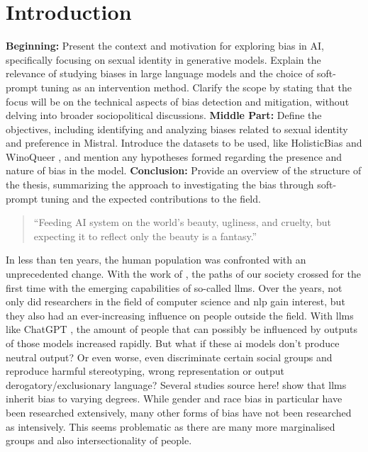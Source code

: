 
\chapter{Introduction}
\textcolor{bhtBlue}{
\textbf{Beginning:} Present the context and motivation for exploring bias in AI, specifically focusing on sexual identity in generative models. Explain the relevance of studying biases in large language models and the choice of soft-prompt tuning as an intervention method. Clarify the scope by stating that the focus will be on the technical aspects of bias detection and mitigation, without delving into broader sociopolitical discussions.
\textbf{Middle Part:} Define the objectives, including identifying and analyzing biases related to sexual identity and preference in Mistral. Introduce the datasets to be used, like HolisticBias \citep{holistic} and WinoQueer \citep{winoqueer}, and mention any hypotheses formed regarding the presence and nature of bias in the model.
\textbf{Conclusion:} Provide an overview of the structure of the thesis, summarizing the approach to investigating the bias through soft-prompt tuning and the expected contributions to the field.}
\\

\begin{quote}
    \large\enquote{Feeding AI system on the world's beauty, ugliness, and cruelty, but expecting it to reflect only the beauty is a fantasy.}
    \par 
    \hspace*{\fill}\small\citet{ruha}
\end{quote}


In less than ten years, the human population was confronted with an unprecedented change. With the work of \citet{vaswani2023attention}, the paths of our society crossed for the first time with the emerging capabilities of so-called \acrfull{llms}. Over the years, not only did researchers in the field of computer science and \acrfull{nlp} gain interest, but they also had an ever-increasing influence on people outside the field. With \acrshort{llms} like ChatGPT \citep{chatgpt-pub}, the amount of people that can possibly be influenced by outputs of those models increased rapidly. But what if these \acrfull{ai} models don't produce neutral output? Or even worse, even discriminate certain social groups and reproduce harmful stereotyping, wrong representation or output derogatory/exclusionary language? 
Several studies \textcolor{bhtRed}{source here!} show that \acrshort{llms} inherit bias to varying degrees. While gender and race bias in particular have been researched extensively, many other forms of bias have not been researched as intensively. This seems problematic as there are many more marginalised groups and also intersectionality of people.


